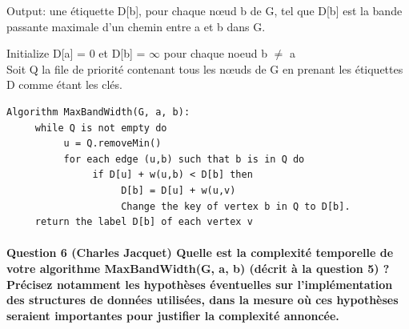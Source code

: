 \documentclass[a4paper]{article}
\begin{document}
     Output: une étiquette D[b], pour chaque nœud b de G, tel que D[b] est la bande passante maximale d’un chemin entre a et b dans G.
      
      Initialize D[a] = 0 et D[b] =  $\infty$ pour chaque noeud b $\neq$ a\\
      Soit Q la file de priorité contenant tous les nœuds de G en prenant les étiquettes D comme étant les clés.
\begin{verbatim}
Algorithm MaxBandWidth(G, a, b):
     while Q is not empty do
          u = Q.removeMin()
          for each edge (u,b) such that b is in Q do
               if D[u] + w(u,b) < D[b] then
                    D[b] = D[u] + w(u,v)
                    Change the key of vertex b in Q to D[b].
     return the label D[b] of each vertex v
\end{verbatim}




\paragraph{Question 6 (Charles Jacquet) Quelle est la complexité temporelle de votre algorithme MaxBandWidth(G, a, b) (décrit à la question 5) ? Précisez notamment les hypothèses éventuelles sur l’implémentation des structures de données utilisées, dans la mesure où ces hypothèses seraient importantes pour justifier la complexité annoncée.}
\end{document}
